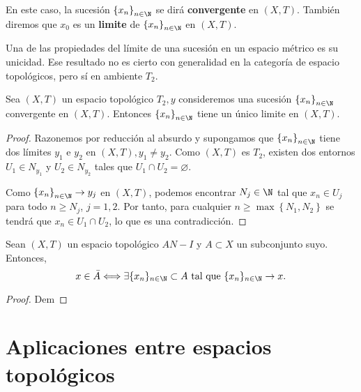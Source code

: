 En este caso, la sucesión $\left\{x_{n}\right\}_{n \in \N}$ se dirá \textbf{convergente} en $(X, T)$. También diremos que $x_{0}$ es un \textbf{limite} de $\left\{x_{n}\right\}_{n \in \N}$ en $(X, T)$.

Una de las propiedades del límite de una sucesión en un espacio métrico es su unicidad. Ese resultado no es cierto con generalidad en la categoría de espacio topológicos, pero sí en ambiente $T_{2}$.
\begin{nth}
Sea $(X, T)$ un espacio topológico $T_{2}, y$ consideremos una sucesión $\left\{x_{n}\right\}_{n \in \N}$ convergente en $(X,T)$. Entonces $\left\{x_{n}\right\}_{n \in \N}$ tiene un único limite en $(X,T)$.
\end{nth}
\begin{proof}
Razonemos por reducción al absurdo y supongamos que $\left\{x_{n}\right\}_{n \in \N}$ tiene dos límites $y_{1}$ e $y_{2}$ en $(X,T), y_{1} \neq y_{2}$. Como $(X,T)$ es $T_{2}$, existen dos entornos $U_{1} \in N_{y_{1}}$ y $U_{2} \in N_{y_{2}}$ tales que $U_{1} \cap U_{2}=\varnothing .$

Como $\left\{x_{n}\right\}_{n \in \N} \rightarrow y_{j}$ en $(X,T)$, podemos encontrar $N_{j} \in \N$ tal que $x_{n} \in U_{j}$ para todo $n \geq N_{j}$, $j=1,2$. Por tanto, para cualquier $n \geq \max \left\{N_{1}, N_{2}\right\}$ se tendrá que $x_{n} \in U_{1} \cap U_{2}$, lo que es una contradicción.
\end{proof}

\begin{nprop}
  Sean $(X, T)$ un espacio topológico $AN-I$ y $A \subset X$ un subconjunto suyo. Entonces,
$$
x \in \bar{A} \Longleftrightarrow \exists \{x_{n} \}_{n \in \N} \subset A \text { tal que } \{x_{n} \}_{n \in \N} \rightarrow x.
$$
\end{nprop}
\begin{proof}
    Dem
\end{proof}
\newpage
\section{Aplicaciones entre espacios topológicos}
